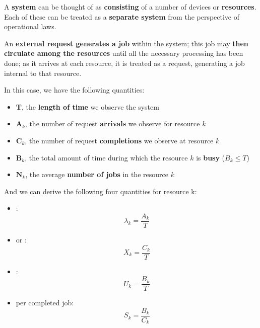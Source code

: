 \highspace
A \textbf{system} can be thought of as \textbf{consisting} of a number of devices or \textbf{resources}. Each of these can be treated as a \textbf{separate system} from the perspective of operational laws.

\highspace
An \textbf{external request generates a job} within the system; this job may \textbf{then circulate among the resources} until all the necessary processing has been done; as it arrives at each resource, it is treated as a request, generating a job internal to that resource.

\highspace
In this case, we have the following quantities:
\begin{itemize}
	\item \textbf{T}, the \textbf{length of time} we observe the system
	\item $\mathbf{A}_{k}$, the number of request \textbf{arrivals} we observe for resource $k$
	\item $\mathbf{C}_{k}$, the number of request \textbf{completions} we observe at resource $k$
	\item $\mathbf{B}_{k}$, the total amount of time during which the resource $k$ is \textbf{busy} ($B_{k} \le T$)
	\item $\mathbf{N}_{k}$, the average \textbf{number of jobs} in the resource $k$
\end{itemize}
And we can derive the following four quantities for resource k:
\begin{itemize}
	\item {}:
	\begin{equation}
		\lambda_{k} = \dfrac{A_{k}}{T}
	\end{equation}
	
	\item {} or :
	\begin{equation}
		X_{k} = \dfrac{C_{k}}{T}
	\end{equation}
	
	\item {}:
	\begin{equation}
		U_{k} = \dfrac{B_{k}}{T}
	\end{equation}
	
	\item {} per completed job:
	\begin{equation}
		S_{k} = \dfrac{B_{k}}{C_{k}}
	\end{equation}
\end{itemize}

